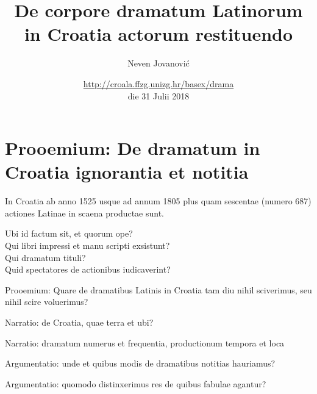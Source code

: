 \documentclass[14pt]{beamer}
\title{De corpore dramatum Latinorum in Croatia actorum restituendo}
\date{\url{http://croala.ffzg.unizg.hr/basex/drama}\\
  die 31 Julii 2018}
\author{Neven Jovanović}
\institute{Facultas philosophica Universitatis Zagrabiensis}
\begin{document}
  \maketitle
  



\section{Prooemium: De dramatum in Croatia ignorantia et notitia}

\begin{frame}
  In Croatia ab anno 1525 usque ad annum 1805 plus quam sescentae (numero 687) actiones Latinae in scaena productae sunt.
\end{frame}

\begin{frame}
  Ubi id factum sit, et quorum ope?\\
  Qui libri impressi et manu scripti exsistunt?\\
  Qui dramatum tituli?\\
  Quid spectatores de actionibus iudicaverint?\\
\end{frame}

\begin{frame}
  Prooemium: Quare de dramatibus Latinis in Croatia tam diu nihil sciverimus, seu nihil scire voluerimus?
\end{frame}

\begin{frame}
Narratio: de Croatia, quae terra et ubi?
\end{frame}

\begin{frame}
Narratio: dramatum numerus et frequentia, productionum tempora et loca
\end{frame}


\begin{frame}
Argumentatio: unde et quibus modis de dramatibus notitias hauriamus?
\end{frame}

\begin{frame}
Argumentatio: quomodo distinxerimus res de quibus fabulae agantur?
\end{frame}
\end{document}
